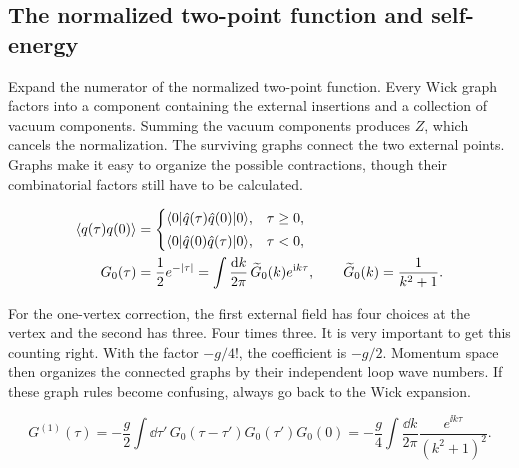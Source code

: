 \subsection{The normalized two-point function and self-energy}

Expand the numerator of the normalized two-point function. Every Wick graph factors into a component containing the external insertions and a collection of vacuum components. Summing the vacuum components produces $Z$, which cancels the normalization. The surviving graphs connect the two external points. Graphs make it easy to organize the possible contractions, though their combinatorial factors still have to be calculated.

\begin{align}
  \langle q(\tau)q(0)\rangle
  &=\begin{cases}
  \langle 0\rvert\hat q(\tau)\hat q(0)\lvert 0\rangle,&\tau\geq0,\\[2pt]
  \langle 0\rvert\hat q(0)\hat q(\tau)\lvert 0\rangle,&\tau<0,
  \end{cases}
  \label{eq:253a-ch02-euclidean-ordering}\\
  G_0(\tau)&=\frac12e^{-|\tau|}
  =\int\frac{\mathop{}\!\mathrm{d} k}{2\pi}\,\widetilde G_0(k)e^{\mathrm{i} k\tau},
  \qquad \widetilde G_0(k)=\frac1{k^2+1}.
  \label{eq:253a-ch02-free-euclidean-propagator}
\end{align}

For the one-vertex correction, the first external field has four choices at the vertex and the second has three. Four times three. It is very important to get this counting right. With the factor $-g/4!$, the coefficient is $-g/2$. Momentum space then organizes the connected graphs by their independent loop wave numbers. If these graph rules become confusing, always go back to the Wick expansion.

\begin{equation}
  G^{(1)}(\tau)
  =-\frac{g}{2}\int \dd\tau'\,
  G_0(\tau-\tau')G_0(\tau')G_0(0)
  =-\frac{g}{4}\int\frac{\dd k}{2\pi}\frac{e^{\ii k\tau}}{(k^2+1)^2}.
  \label{eq:253a-ch02-tadpole-correction}
\end{equation}

